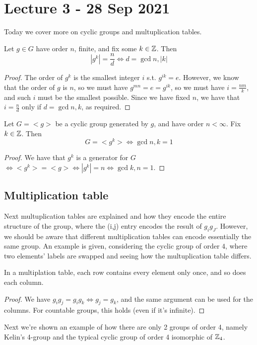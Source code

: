 \section{Lecture 3 - 28 Sep 2021}
Today we cover more on cyclic groups and multuplication tables.
\begin{theorem}
  Let $g\in G$ have order $n$, finite, and fix some $k\in\mathbb Z$. Then
  \[|g^k|= \frac{n}{d} \iff d=\gcd{n,|k|}\]
\end{theorem}
\begin{proof}
  The order of $g^k$ is the smallest integer $i$ s.t. $g^{ik}=e$. However, we know that the
  order of $g$ is $n$, so we must have $g^{mn}=e=g^{ik}$, so we must have
  $i=\frac{nm}{k}$, and such $i$ must be the smallest possible. Since we have fixed $n$,
  we have that $i=\frac{n}{d}$ only if $d=\gcd{n,k}$, as required.
\end{proof}

\begin{cor}
  Let $G=<g>$ be a cyclic group generated by $g$, and have order $n<\infty$. Fix
  $k\in\mathbb Z$. Then
  \[G=<g^k> \iff \gcd{n,k}=1\]
\end{cor}
\begin{proof}
  We have that $g^k$ is a generator for $G$ $\iff <g^k>=<g> \iff |g^k|=n \iff
  \gcd{k,n}=1$.
\end{proof}


\subsection{Multiplication table}
Next multuplication tables are explained and how they encode the entire structure of the
group, where the (i,j) entry encodes the result of $g_ig_J$. However, we should be aware
that different multiplication tables can encode essentially the same group. An example is
given, considering the cyclic group of order $4$, where two elements' labels are swapped
and seeing how the multuplication table differs.
\begin{theorem}
  In a multiplation table, each row contains every element only once, and so does each
  column. 
\end{theorem}
\begin{proof}
  We have $g_ig_j = g_i g_k \iff g_j=g_k$, and the same argument can be used for the
  columns. For countable groups, this holds (even if it's infinite).
\end{proof}

Next we're shown an example of how there are only 2 groups of order 4, namely Kelin's
4-group and the typical cyclic group of order 4 isomorphic of $\mathbb Z_4$.
